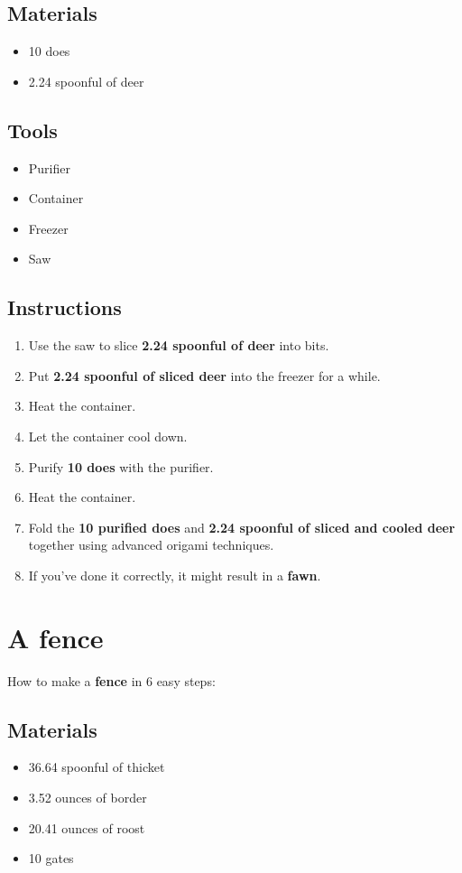\documentclass{article}
\begin{document}
\subsection{Materials}\begin{itemize}
\item 
10 does
\item 
2.24 spoonful of deer
\end{itemize}
\subsection{Tools}\begin{itemize}
\item 
Purifier
\item 
Container
\item 
Freezer
\item 
Saw
\end{itemize}
\subsection{Instructions}\begin{enumerate}
\item 
Use the saw to slice \textbf{2.24 spoonful of deer} into bits.
\item 
Put \textbf{2.24 spoonful of sliced deer} into the freezer for a while.
\item 
Heat the container.
\item 
Let the container cool down.
\item 
Purify \textbf{10 does} with the purifier.
\item 
Heat the container.
\item 
Fold the \textbf{10 purified does} and \textbf{2.24 spoonful of sliced and cooled deer} together using advanced origami techniques.
\item 
If you've done it correctly, it might result in a \textbf{fawn}.
\end{enumerate}
\newpage
\section{A fence}How to make a \textbf{fence} in 6 easy steps:

\subsection{Materials}\begin{itemize}
\item 
36.64 spoonful of thicket
\item 
3.52 ounces of border
\item 
20.41 ounces of roost
\item 
10 gates
\end{itemize}
\end{document}
